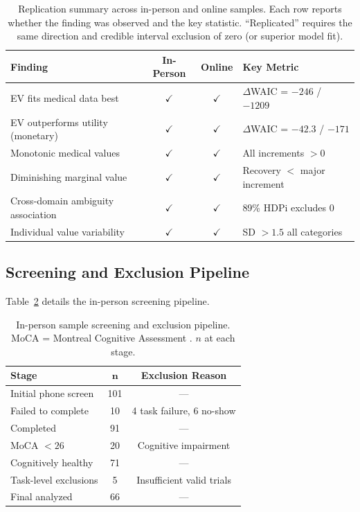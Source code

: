 \documentclass[11pt]{article}
\begin{document}
\begin{table}[H]
\centering
\caption{Replication summary across in-person and online samples. Each row reports whether the finding was observed and the key statistic. ``Replicated'' requires the same direction and credible interval exclusion of zero (or superior model fit).}
\label{tab:replication}
\begin{tabular}{lccl}
\toprule
\textbf{Finding} & \textbf{In-Person} & \textbf{Online} & \textbf{Key Metric} \\
\midrule
EV fits medical data best & $\checkmark$ & $\checkmark$ & $\Delta$WAIC = $-246$ / $-1209$ \\
EV outperforms utility (monetary) & $\checkmark$ & $\checkmark$ & $\Delta$WAIC = $-42.3$ / $-171$ \\
Monotonic medical values & $\checkmark$ & $\checkmark$ & All increments $> 0$ \\
Diminishing marginal value & $\checkmark$ & $\checkmark$ & Recovery $<$ major increment \\
Cross-domain ambiguity association & $\checkmark$ & $\checkmark$ & 89\% HDPi excludes 0 \\
Individual value variability & $\checkmark$ & $\checkmark$ & SD $> 1.5$ all categories \\
\bottomrule
\end{tabular}
\end{table}

\subsection{Screening and Exclusion Pipeline}

Table~\ref{tab:exclusion} details the in-person screening pipeline.

\begin{table}[H]
\centering
\caption{In-person sample screening and exclusion pipeline. MoCA = Montreal Cognitive Assessment \citep{nasreddine2005montreal}. $n$ at each stage.}
\label{tab:exclusion}
\begin{tabular}{lcc}
\toprule
\textbf{Stage} & $\boldsymbol{n}$ & \textbf{Exclusion Reason} \\
\midrule
Initial phone screen & 101 & --- \\
Failed to complete & 10 & 4 task failure, 6 no-show \\
Completed & 91 & --- \\
MoCA $< 26$ & 20 & Cognitive impairment \\
Cognitively healthy & 71 & --- \\
Task-level exclusions & 5 & Insufficient valid trials \\
Final analyzed & 66 & --- \\
\bottomrule
\end{tabular}
\end{table}
\end{document}
